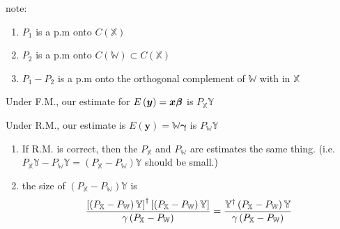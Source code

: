 \documentclass{article}
\begin{document}
note:

\begin{enumerate}
\item $P_{1}$ is a p.m onto $C\left( \mathbb{X}\right) $

\item $P_{2}$ is a p.m onto $C\left( \mathbb{W}\right) \subset C\left( 
\mathbb{X}\right) $

\item $P_{1}-P_{2}$ is a p.m onto the orthogonal complement of $\mathbb{W}$
with in $\mathbb{X}$
\end{enumerate}

\bigskip


\bigskip

Under F.M., our estimate for $E\left( \boldsymbol{y}\right) =\boldsymbol{%
x\beta }$ is $P_{\mathbb{X}}\mathbb{Y}$

Under R.M., our estimate is $E\left( \boldsymbol{y}\right) =\mathbb{W}%
\boldsymbol{\gamma }$ is $P_{\mathbb{W}}\mathbb{Y}$

\begin{enumerate}
\item If R.M. is correct, then the $P_{\mathbb{X}}$ and $P_{\mathbb{W}}$ are
estimates the same thing. (i.e. $P_{\mathbb{X}}\mathbb{Y}-P_{\mathbb{W}}%
\mathbb{Y=}\left( P_{\mathbb{X}}-P_{\mathbb{W}}\right) \mathbb{Y}$ should be
small.)

\item the size of $\left( P_{\mathbb{X}}-P_{\mathbb{W}}\right) \mathbb{Y}$ is%
\begin{equation*}
\frac{\left[ \left( P_{\mathbb{X}}-P_{\mathbb{W}}\right) \mathbb{Y}\right]
^{\dagger }\left[ \left( P_{\mathbb{X}}-P_{\mathbb{W}}\right) \mathbb{Y}%
\right] }{\gamma \left( P_{\mathbb{X}}-P_{\mathbb{W}}\right) }=\frac{\mathbb{%
Y}^{\dagger }\left( P_{\mathbb{X}}-P_{\mathbb{W}}\right) \mathbb{Y}}{\mathbb{%
\gamma }\left( P_{\mathbb{X}}-P_{\mathbb{W}}\right) }
\end{equation*}
\end{enumerate}

\bigskip
\end{document}
